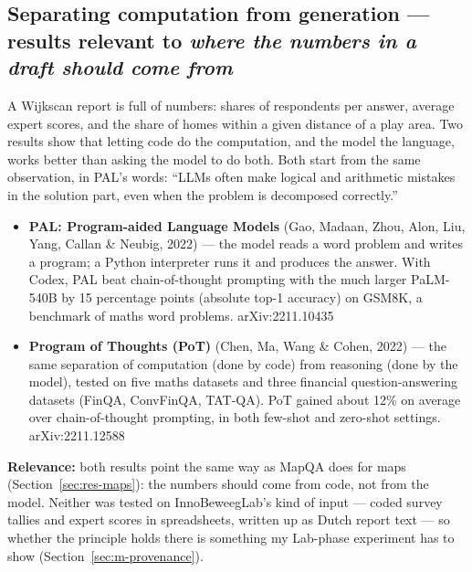 \subsection{Separating computation from generation --- results relevant to \textit{where the numbers in a draft should come from}}\label{sec:res-compute}

A Wijkscan report is full of numbers: shares of respondents per answer, average expert scores, and the share of homes within a given distance of a play area. Two results show that letting code do the computation, and the model the language, works better than asking the model to do both. Both start from the same observation, in PAL's words: \textquotedblleft{}LLMs often make logical and arithmetic mistakes in the solution part, even when the problem is decomposed correctly.\textquotedblright{}

\begin{itemize}
\item \textbf{PAL: Program-aided Language Models} (Gao, Madaan, Zhou, Alon, Liu, Yang, Callan \& Neubig, 2022) --- the model reads a word problem and writes a program; a Python interpreter runs it and produces the answer. With Codex, PAL beat chain-of-thought prompting with the much larger PaLM-540B by 15 percentage points (absolute top-1 accuracy) on GSM8K, a benchmark of maths word problems. arXiv:2211.10435
\item \textbf{Program of Thoughts (PoT)} (Chen, Ma, Wang \& Cohen, 2022) --- the same separation of computation (done by code) from reasoning (done by the model), tested on five maths datasets and three financial question-answering datasets (FinQA, ConvFinQA, TAT-QA). PoT gained about 12\% on average over chain-of-thought prompting, in both few-shot and zero-shot settings. arXiv:2211.12588
\end{itemize}

\textbf{Relevance:} both results point the same way as MapQA does for maps (Section~\ref{sec:res-maps}): the numbers should come from code, not from the model. Neither was tested on InnoBeweegLab's kind of input --- coded survey tallies and expert scores in spreadsheets, written up as Dutch report text --- so whether the principle holds there is something my Lab-phase experiment has to show (Section~\ref{sec:m-provenance}).
